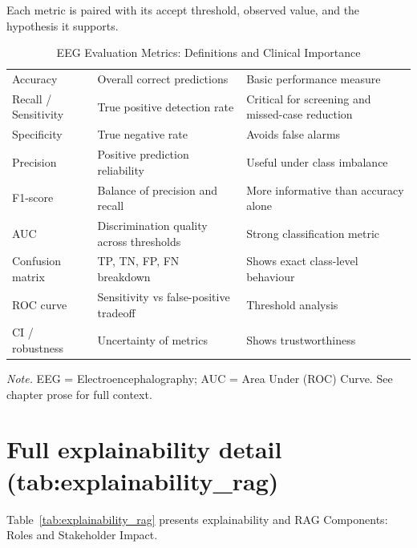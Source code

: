 \noindent Each metric is paired with its accept threshold, observed value, and the hypothesis it supports.
{\tablestripes\tablefontsize

\begin{xltabular}{\textwidth}{@{} l L L @{}}
\caption[EEG Evaluation Metrics]{EEG Evaluation Metrics: Definitions and Clinical Importance}\label{tab:eeg_evaluation_metrics} \\
\toprule
{} &  &  \\
\midrule
\endfirsthead
\endhead
\bottomrule
\endlastfoot
Accuracy & Overall correct predictions & Basic performance measure \\
Recall / Sensitivity & True positive detection rate & Critical for screening and missed-case reduction \\
Specificity & True negative rate & Avoids false alarms \\
Precision & Positive prediction reliability & Useful under class imbalance \\
F1-score & Balance of precision and recall & More informative than accuracy alone \\
AUC & Discrimination quality across thresholds & Strong classification metric \\
Confusion matrix & TP, TN, FP, FN breakdown & Shows exact class-level behaviour \\
ROC curve & Sensitivity vs false-positive tradeoff & Threshold analysis \\
CI / robustness & Uncertainty of metrics & Shows trustworthiness \\
\end{xltabular}}
\vspace{0.3em}\noindent\textit{Note.} EEG = Electroencephalography; AUC = Area Under (ROC) Curve. See chapter prose for full context.


\section{Full explainability detail (tab:explainability\_\allowbreak rag)}
\label{sec:appendix_ch4_tab_explainability_rag}
\noindent Table~\ref{tab:explainability_rag} presents explainability and RAG Components: Roles and Stakeholder Impact.


